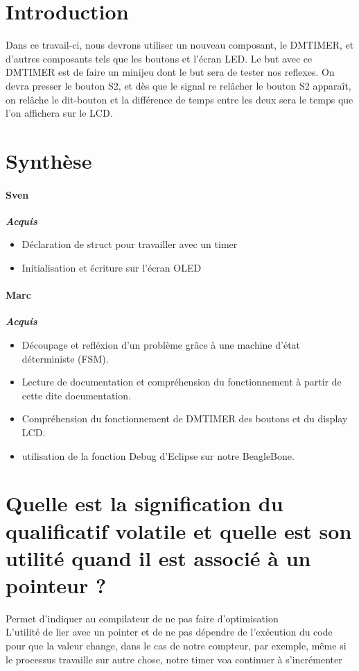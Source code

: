 \section{Introduction}
Dans ce travail-ci, nous devrons utiliser un nouveau composant, le DMTIMER, et d'autres composants tels que les boutons et l'écran LED. Le but avec ce DMTIMER est de faire un minijeu dont le but sera de tester nos reflexes. On devra presser le bouton S2, et dès que le signal re relâcher le bouton S2 apparaît, on relâche le dit-bouton et la différence de temps entre les deux sera le temps que l'on affichera sur le LCD.
\section{Synthèse}

\paragraph{Sven}
\textbf{\textit{Acquis}}
\begin{itemize}
   \item Déclaration de struct pour travailler avec un timer
   \item Initialisation et écriture sur l'écran OLED
\end{itemize}

\paragraph{Marc}
\textbf{\textit{Acquis}}
\begin{itemize}
   \item Découpage et refléxion d'un problème grâce à une machine d'état déterministe (FSM).
   \item Lecture de documentation et compréhension du fonctionnement à partir de cette dite documentation.
   \item Compréhension du fonctionnement de DMTIMER des boutons et du display LCD.
   \item utilisation de la fonction Debug d'Eclipse sur notre BeagleBone.
\end{itemize}
 

\section{Quelle est la signification du qualificatif volatile et quelle est son utilité quand il est associé à un pointeur ?}
Permet d'indiquer au compilateur de ne pas faire d'optimisation \\
L'utilité de lier avec un pointer et de ne pas dépendre de l'exécution du code pour que la valeur change, dans le cas de notre compteur, par exemple, même si le processus travaille sur autre chose, notre timer voa continuer à s'incrémenter
 
